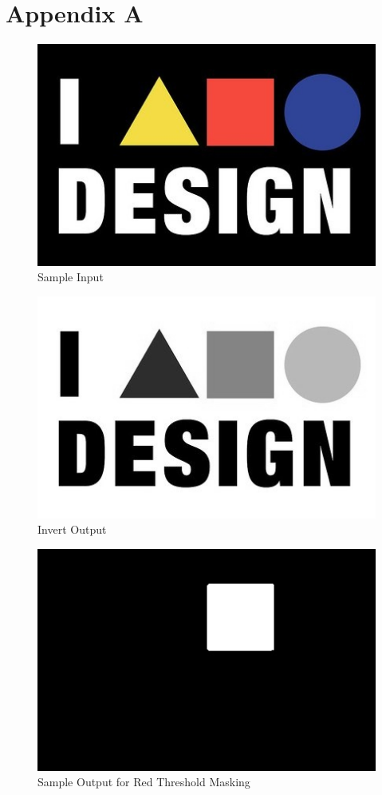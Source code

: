 \section{Appendix A}\label{sec:vision_appendix_A}

\begin{figure}[h]
	\includegraphics[scale=0.5]{./figure/normal.jpg}
	\caption{Sample Input}
	\label{fig:normal output}
\end{figure}

\begin{figure}[h]
	\includegraphics[scale=0.5]{./figure/negative.jpg}
	\caption{Invert Output}
	\label{fig:Invert output}
\end{figure}

\begin{figure}[h]
	\includegraphics[scale=0.45]{./figure/mask.jpg}
	\caption{Sample Output for Red Threshold Masking}
	\label{fig:masking output}
\end{figure}


